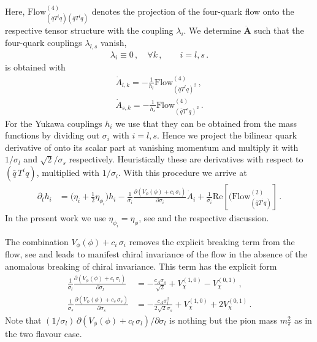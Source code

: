 \documentclass[reprint,twocolumn,superscriptaddress,preprintnumbers,amsmath,amssymb,aps,prd,floatfix]{revtex4-2}
\begin{document}
%
Here, $\text{Flow} _{(\bar q T^i q) (\bar q T^i q)}^{(4)}$ denotes the projection of the four-quark flow onto the respective tensor structure with the coupling  $\lambda_i$. We determine $\dot{\boldsymbol{A}}$ such that the four-quark couplings $\lambda_{l,s}$ vanish, 
%
\begin{align}
\lambda_{i}  \equiv 0\, , \quad \forall k\,, \qquad i=l,s\,.
\label{lambda_eq}
\end{align}
%
 is obtained with
%
\begin{align}\nonumber 
\dot{A}_{l,k}=-\frac{1}{ h_{l}} \text{Flow}_{(\bar q T^l q)^2}^{(4)}\,, \\[1ex]
\dot{A}_{s,k}=-\frac{1}{ h_{s}}  \text{Flow}_{(\bar q T^s q)^2}^{(4)}\,.
\end{align}
%
For the Yukawa couplings $h_i$ we use that they can be obtained from the mass functions by dividing out $\sigma_i$ with $i=l,s$. Hence we project the bilinear quark derivative of  onto its scalar part at vanishing momentum and multiply it with $1/\sigma_l$ and $\sqrt{2}/\sigma_s$ respectively. Heuristically these are derivatives with respect to $(\bar q\, T^i q)$, multiplied with $1/\sigma_i$. With this procedure we arrive at 
%
\begin{align}
	\partial_t h_{i}&=\bigg(\eta_{i}+\frac{1}{2} \eta_{\phi_i}\bigg) h_{i} - \frac{1}{ \sigma_i}\frac{\partial \left( {V}_\phi(\phi)+ c_i\, \sigma_i\right)}{\partial  \sigma_i} \dot{ A}_{i}+\frac{1}{ \sigma_i}\text{Re}\left[({\text{Flow}}^{(2)}_{(\bar q T^i q)}\right]\,.  \label{eq:Yukawa_R}
\end{align}
%
In the present work we use $\eta_{\phi_i}=\eta_\phi$, see  and the respective discussion. 

The combination ${V}_\phi(\phi)+ c_i\, \sigma_i$ removes the explicit breaking term from the flow, see  and leads to manifest chiral invariance of the flow in the absence of the anomalous breaking of chiral invariance. 
This term has the explicit form 
%
\begin{align}\nonumber 
	\frac{1}{ \sigma_l}\frac{\partial \left( {V}_\phi(\phi)+ c_l\, \sigma_l\right)}{\partial  \sigma_l}&=- \frac{ c_A  \sigma_s}{\sqrt{2}}  + V_\chi^{(1,0)} - V_\chi^{(0,1)}\,,\\[1ex]
\frac{1}{ \sigma_s}\frac{\partial \left( {V}_\phi(\phi)+ c_s\, \sigma_s\right)}{\partial  \sigma_s}&=- \frac{ c_A  \sigma_l^2}{2 \sqrt{2}  \sigma_s}+ V_\chi^{(1,0)} +2  V_\chi^{(0,1)}\,.
\label{eq:CovariantShifts}
\end{align}
%
Note that $({1}/{ \sigma_l}) \,{\partial \left( {V}_\phi(\phi)+ c_l\, \sigma_l\right)}/{\partial  \sigma_l}$ is nothing but the pion mass $ m_\pi^2$ as in the two flavour case. 
\end{document}
